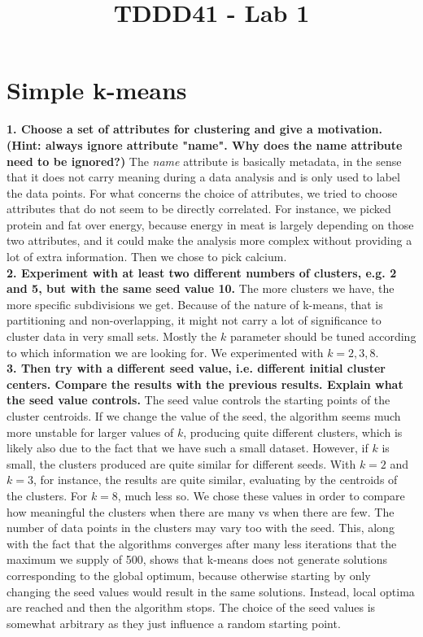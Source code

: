 \documentclass[]{article}
\title{TDDD41 - Lab 1}
\author{}
\begin{document}
\maketitle

\section{Simple k-means}

\textbf{1. Choose a set of attributes for clustering and give a motivation. (Hint: always ignore attribute "name". Why does the name attribute need to be ignored?)}
The \textit{name} attribute is basically metadata, in the sense that it does not carry meaning during a data analysis and is only used to label the data points. For what concerns the choice of attributes, we tried to choose attributes that do not seem to be directly correlated. For instance, we picked protein and fat over energy, because energy in meat is largely depending on those two attributes, and it could make the analysis more complex without providing a lot of extra information. Then we chose to pick calcium.\\

\noindent\textbf{2. Experiment with at least two different numbers of clusters, e.g. 2 and 5, but with the same seed value 10.}
The more clusters we have, the more specific subdivisions we get. Because of the nature of k-means, that is partitioning and non-overlapping, it might not carry a lot of significance to cluster data in very small sets. Mostly the $k$ parameter should be tuned according to which information we are looking for. We experimented with $k=2,3,8$.\\

\noindent\textbf{3. Then try with a different seed value, i.e. different initial cluster centers. Compare the results with the previous results. Explain what the seed value controls.}
The seed value controls the starting points of the cluster centroids. If we change the value of the seed, the algorithm seems much more unstable for larger values of $k$, producing quite different clusters, which is likely also due to the fact that we have such a small dataset. However, if $k$ is small, the clusters produced are quite similar for different seeds. With $k=2$ and $k=3$, for instance, the results are quite similar, evaluating by the centroids of the clusters. For $k=8$, much less so. We chose these values in order to compare how meaningful the clusters when there are many vs when there are few. The number of data points in the clusters may vary too with the seed. This, along with the fact that the algorithms converges after many less iterations that the maximum we supply of 500, shows that k-means does not generate solutions corresponding to the global optimum, because otherwise starting by only changing the seed values would result in the same solutions. Instead, local optima are reached and then the algorithm stops. The choice of the seed values is somewhat arbitrary as they just influence a random starting point.\\
\end{document}
